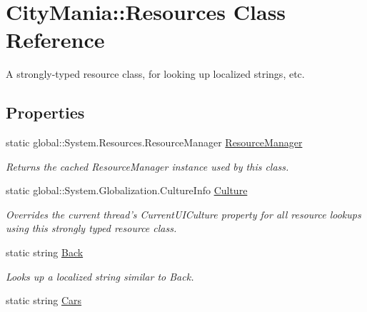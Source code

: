 \hypertarget{classCityMania_1_1Resources}{
\section{CityMania::Resources Class Reference}
\label{classCityMania_1_1Resources}
}


A strongly-\/typed resource class, for looking up localized strings, etc.  
\subsection*{Properties}
\begin{DoxyCompactItemize}
\item 
static global::System.Resources.ResourceManager \hyperlink{classCityMania_1_1Resources_a3d06ecff941444976e30fb5e31938ad1}{ResourceManager}
\begin{DoxyCompactList}\small\item\em Returns the cached ResourceManager instance used by this class. \item\end{DoxyCompactList}\item 
static global::System.Globalization.CultureInfo \hyperlink{classCityMania_1_1Resources_a218d1275037fd80512950b4f196d2899}{Culture}
\begin{DoxyCompactList}\small\item\em Overrides the current thread's CurrentUICulture property for all resource lookups using this strongly typed resource class. \item\end{DoxyCompactList}\item 
static string \hyperlink{classCityMania_1_1Resources_a8d5378dee3e6fa58682fe86eabb41835}{Back}
\begin{DoxyCompactList}\small\item\em Looks up a localized string similar to Back. \item\end{DoxyCompactList}\item 
static string \hyperlink{classCityMania_1_1Resources_a933437ce6fc05a82924f3d601b1317dd}{Cars}

\end{DoxyCompactItemize}
